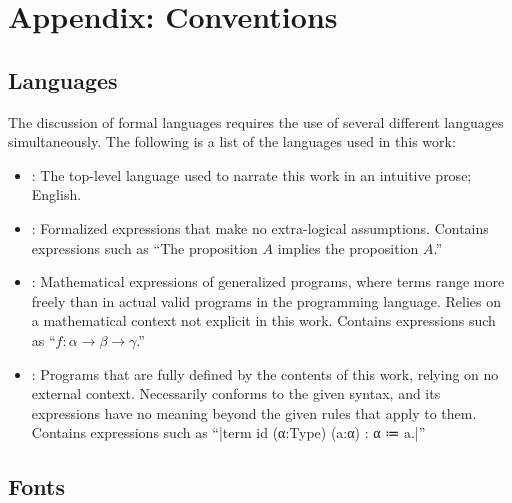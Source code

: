 \chapter{Appendix: Conventions}
\label{app:conventions}

\section{Languages}

The discussion of formal languages requires the use of several different languages simultaneously.
The following is a list of the languages used in this work:
\begin{itemize}
  \item {}:
    The top-level language used to narrate this work in an intuitive prose;
    English.
  \item {}:
    Formalized expressions that make no extra-logical assumptions.
    Contains expressions such as ``The proposition $A$ implies the proposition $A$.''
  \item {}:
    Mathematical expressions of generalized programs, where terms range more freely than in actual valid programs in the programming language.
    Relies on a mathematical context not explicit in this work.
    Contains expressions such as ``$f : α \to β \to γ$.''
  \item {}:
    Programs that are fully defined by the contents of this work, relying on no external context.
    Necessarily conforms to the given syntax, and its expressions have no meaning beyond the given rules that apply to them.
    Contains expressions such as ``\code|term id (α:Type) (a:α) : α ≔ a.|''
\end{itemize}

\section{Fonts}

